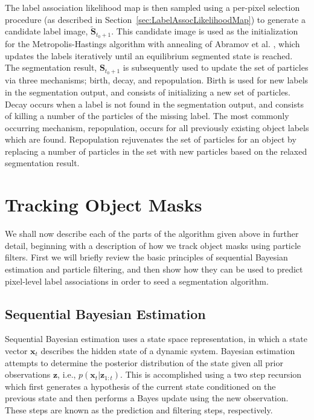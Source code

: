 The label association likelihood map is then sampled using a per-pixel selection procedure (as described in Section~\ref{sec:LabelAssocLikelihoodMap}) to generate a candidate label image, $\tilde{\mathbf{S}}_{t_0+1}$. This candidate image is used as the initialization for the Metropolis-Hastings algorithm with annealing of Abramov et al. \cite{Abramov_RealtimeSegmentation}, which updates the labels iteratively until an equilibrium segmented state is reached. The segmentation result, $\mathbf{S}_{t_0+1}$  is subsequently used to update the set of particles via three mechanisms; birth, decay, and repopulation. Birth is used for new labels in the segmentation output, and consists of initializing a new set of particles. Decay occurs when a label is not found in the segmentation output, and consists of killing a number of the particles of the missing label. The most commonly occurring mechanism, repopulation, occurs for all previously existing object labels which are found. Repopulation rejuvenates the set of particles for an object by replacing a number of particles in the set with new particles based on the relaxed segmentation result. 

\section{Tracking Object Masks}
We shall now describe each of the parts of the algorithm given above in further detail, beginning with a description of how we track object masks using particle filters. First we will briefly review the basic principles of sequential Bayesian estimation and particle filtering, and then show how they can be used to predict pixel-level label associations in order to seed a segmentation algorithm.

\subsection{Sequential Bayesian Estimation}
Sequential Bayesian estimation uses a state space representation, in which a state vector $\mathbf{x}_t$ describes the hidden state of a dynamic system. Bayesian estimation attempts to determine the posterior distribution of the state given all prior observations $\mathbf{z}$, i.e., $\mathit{p}(\mathbf{x}_t|\mathbf{z}_{1:t})$. This is accomplished using a two step recursion which first generates a hypothesis of the current state conditioned on the previous state and then performs a Bayes update using the new observation. These steps are known as the prediction and filtering steps, respectively. 

